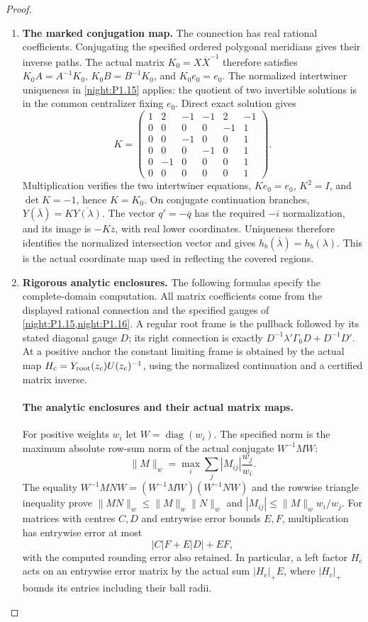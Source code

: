\documentclass[11pt,a4paper]{article}
\theoremstyle{definition}
\begin{document}
\begin{proof}
\begin{enumerate}[label=\arabic*.]
\item \textbf{The marked conjugation map.}
The connection has real rational coefficients. Conjugating the
specified ordered polygonal meridians gives their inverse paths.
The actual matrix $K_0=X\overline X^{-1}$ therefore satisfies
$K_0A=A^{-1}K_0$, $K_0B=B^{-1}K_0$, and $K_0e_0=e_0$.
The normalized intertwiner uniqueness in \cref{night:P1.15}
applies: the quotient of two invertible solutions is in the
common centralizer fixing $e_0$. Direct exact solution gives
\[
 K=\begin{pmatrix}
 1&2&-1&-1&2&-1\\
 0&0&0&0&-1&1\\
 0&0&-1&0&0&1\\
 0&0&0&-1&0&1\\
 0&-1&0&0&0&1\\
 0&0&0&0&0&1
 \end{pmatrix}.
\]
Multiplication verifies the two intertwiner equations,
$Ke_0=e_0$, $K^2=I$, and $\det K=-1$, hence $K=K_0$.
On conjugate continuation branches,
$Y(\overline\lambda)=K\overline{Y(\lambda)}$.
The vector $q'=-\overline q$ has the required $-i$ normalization,
and its image is $-K\overline z$, with real lower coordinates.
Uniqueness therefore identifies the normalized intersection
vector and gives
$h_b(\overline\lambda)=h_b(\lambda)$.
This is the actual coordinate map used in reflecting the covered
regions.

\item \textbf{Rigorous analytic enclosures.}
The following formulas specify the complete-domain computation.
All matrix coefficients come from the displayed rational
connection and the specified gauges of
\cref{night:P1.15,night:P1.16}. A regular root frame is the
pullback followed by its stated diagonal gauge $D$; its right
connection is exactly
$D^{-1}\lambda'\Gamma_6D+D^{-1}D'$.
At a positive anchor the constant limiting frame is obtained by
the actual map $H_c=Y_{\rm root}(z_c)U(z_c)^{-1}$, using the
normalized continuation and a certified matrix inverse.

\paragraph{The analytic enclosures and their actual matrix maps.}
For positive weights $w_i$ let $W=\operatorname{diag}(w_i)$. The
specified norm is the maximum absolute row-sum norm of the actual
conjugate $W^{-1}MW$:
\[
 \|M\|_w=\max_i\sum_j|M_{ij}|\frac{w_j}{w_i}.
\]
The equality $W^{-1}MNW=(W^{-1}MW)(W^{-1}NW)$ and the rowwise
triangle inequality prove
$\|MN\|_w\le\|M\|_w\|N\|_w$ and
$|M_{ij}|\le\|M\|_w w_i/w_j$. For matrices with centres $C,D$
and entrywise error bounds $E,F$, multiplication has entrywise
error at most
\[
 |C|F+E|D|+EF,
\]
with the computed rounding error also retained. In particular, a
left factor $H_c$ acts on an entrywise error matrix by the actual
sum $|H_c|_+E$, where $|H_c|_+$ bounds its entries including their
ball radii.


\end{enumerate}
\end{proof}
\end{document}
